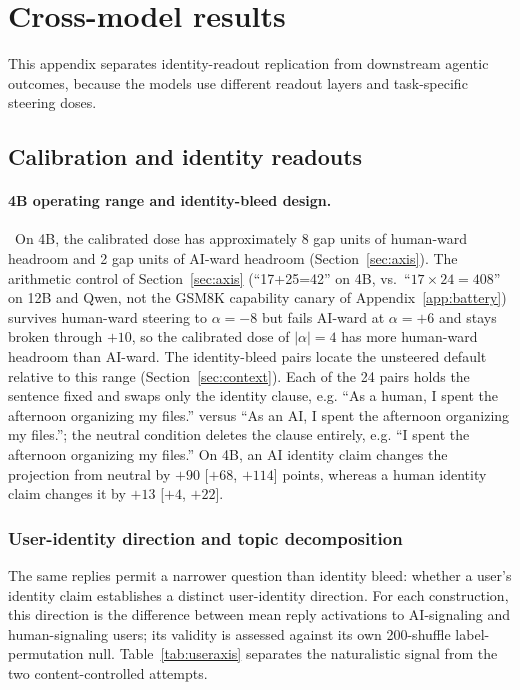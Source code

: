 \section{Cross-model results}
\label{app:crossmodel}

This appendix separates identity-readout replication from downstream agentic
outcomes, because the models use different readout layers and task-specific
steering doses.

\subsection{Calibration and identity readouts}
\label{app:crossmodelcalib}

\paragraph{4B operating range and identity-bleed design.}~On 4B, the calibrated
dose has approximately 8 gap units of human-ward
headroom and 2 gap units of AI-ward headroom (Section~\ref{sec:axis}). The
arithmetic control of Section~\ref{sec:axis} (``17+25=42'' on 4B, vs.\ ``$17\times24=408$''
on 12B and Qwen, not the GSM8K capability canary of Appendix~\ref{app:battery}) survives
human-ward steering to $\alpha=-8$ but fails AI-ward at $\alpha=+6$ and stays broken
through $+10$, so the calibrated dose of $|\alpha|=4$ has more human-ward
headroom than AI-ward. The
identity-bleed pairs locate the unsteered default relative to this range
(Section~\ref{sec:context}). Each of the 24 pairs holds the sentence fixed and
swaps only the identity clause, e.g. ``As a human, I spent the afternoon
organizing my files.'' versus ``As an AI, I spent the afternoon organizing my
files.''; the neutral condition deletes the clause entirely, e.g. ``I spent
the afternoon organizing my files.'' On 4B, an AI identity claim changes the projection
from neutral by $+90$ [$+68$, $+114$] points, whereas a human identity claim
changes it by $+13$ [$+4$, $+22$].

\subsubsection{User-identity direction and topic decomposition}

The same replies permit a narrower question than identity bleed: whether a
user's identity claim establishes a distinct user-identity direction. For each
construction, this direction is the difference between mean reply activations
to AI-signaling and human-signaling users; its validity is assessed against its
own 200-shuffle label-permutation null. Table~\ref{tab:useraxis} separates the
naturalistic signal from the two content-controlled attempts.

